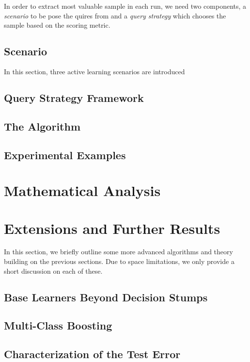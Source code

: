 \documentclass[english,12pt]{article}
\begin{document}
	In order to extract most valuable sample in each run, we need two components, a {\em scenario} to be pose the quires from and a {\em query strategy} which chooses the sample based on the scoring metric.
	
	\subsection{Scenario}
	In this section, three active learning scenarios are introduced
	\subsection{Query Strategy Framework}
	
	
	\subsection{The Algorithm}
	
	
	\subsection{Experimental Examples}
	
	
	\section{Mathematical Analysis} \label{sec:math}
	  
	
	\section{Extensions and Further Results} \label{sec:ext}
	
	In this section, we briefly outline some more advanced algorithms and theory building on the previous sections.  Due to space limitations, we only provide a short discussion on each of these.
	
	\subsection{Base Learners Beyond Decision Stumps} \label{sec:base}
	
	
	\subsection{Multi-Class Boosting} \label{sec:multi}
	
	
	\subsection{Characterization of the Test Error} \label{sec:test_error}
	
\end{document}
